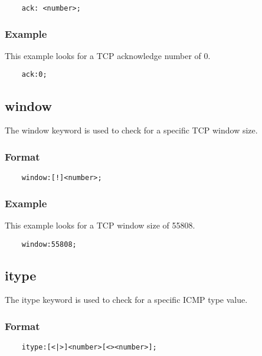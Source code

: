 \documentclass[english]{report}
\begin{document}
\begin{verbatim}
    ack: <number>;
\end{verbatim}

\subsubsection{Example}

This example looks for a TCP acknowledge number of 0.

\begin{verbatim}
    ack:0;
\end{verbatim}

\subsection{window}

The window keyword is used to check for a specific TCP window size.

\subsubsection{Format}

\begin{verbatim}
    window:[!]<number>;
\end{verbatim}

\subsubsection{Example}

This example looks for a TCP window size of 55808.

\begin{verbatim}
    window:55808;
\end{verbatim}

\subsection{itype}

The itype keyword is used to check for a specific ICMP type value.

\subsubsection{Format}

\begin{verbatim}
    itype:[<|>]<number>[<><number>];
\end{verbatim}
\end{document}
